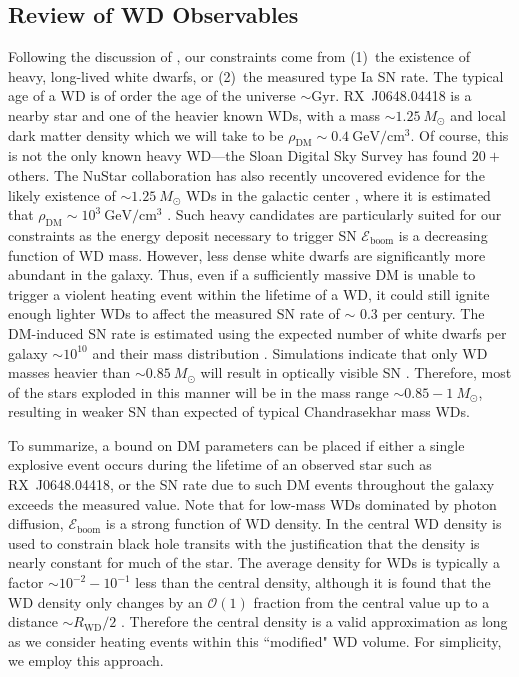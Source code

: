 \documentclass[twocolumn, preprintnumbers,amsmath,amssymb,prd, superscriptaddress]{revtex4}
\newcommand{\Eboom}{\mathcal{E}_\text{boom}}
\newcommand{\OO}{\mathcal{O}}
\newcommand{\GeV}{\text{GeV}}
\begin{document}
\subsection{Review of WD Observables}
Following the discussion of \cite{Graham:2015apa}, our constraints come from (1)~the existence of heavy, long-lived white dwarfs, or (2)~the measured type Ia SN rate.
The typical age of a WD is of order the age of the universe $\sim \text{Gyr}$.
RX~J0648.04418 is a nearby star and one of the heavier known WDs, with a mass $\sim 1.25 ~M_{\odot}$ \cite{Mereghetti:2013nba} and local dark matter density which we will take to be $\rho_\text{DM} \sim 0.4 ~\GeV/\text{cm}^3$.
Of course, this is not the only known heavy WD---the Sloan Digital Sky Survey \cite{SDSS0} has found $20+$ others.
The NuStar collaboration has also recently uncovered evidence for the likely existence of $\sim 1.25 ~M_{\odot}$ WDs in the galactic center \cite{NuStar}, where it is estimated that $\rho_\text{DM} \sim 10^3 ~\text{GeV}/\text{cm}^3$ \cite{Nesti:2013uwa}.
Such heavy candidates are particularly suited for our constraints as the energy deposit necessary to trigger SN $\Eboom$ is a decreasing function of WD mass.
However, less dense white dwarfs are significantly more abundant in the galaxy.
Thus, even if a sufficiently massive DM is unable to trigger a violent heating event within the lifetime of a WD, it could still ignite enough lighter WDs to affect the measured SN rate of $\sim $ 0.3 per century.
The DM-induced SN rate is estimated using the expected number of white dwarfs per galaxy $\sim 10^{10}$ and their mass distribution \cite{SDSS}.
Simulations indicate that only WD masses heavier than $\sim 0.85 ~M_{\odot}$ will result in optically visible SN \cite{Graham:2015apa}.
Therefore, most of the stars exploded in this manner will be in the mass range $\sim 0.85 - 1 ~M_{\odot}$, resulting in weaker SN than expected of typical Chandrasekhar mass WDs.

To summarize, a bound on DM parameters can be placed if either a single explosive event occurs during the lifetime of an observed star such as RX~J0648.04418, or the SN rate due to such DM events throughout the galaxy exceeds the measured value.
Note that for low-mass WDs dominated by photon diffusion, $\Eboom$ is a strong function of WD density.
In \cite{Graham:2015apa} the central WD density is used to constrain black hole transits with the justification that the density is nearly constant for much of the star.
The average density for WDs is typically a factor $\sim 10^{-2} - 10^{-1}$ less than the central density, although it is found that the WD density only changes by an $\OO(1)$ fraction from the central value up to a distance $\sim R_\text{WD}/2$ \cite{Chandrasekhar}.
Therefore the central density is a valid approximation as long as we consider heating events within this ``modified" WD volume.
For simplicity, we employ this approach.
\end{document}
